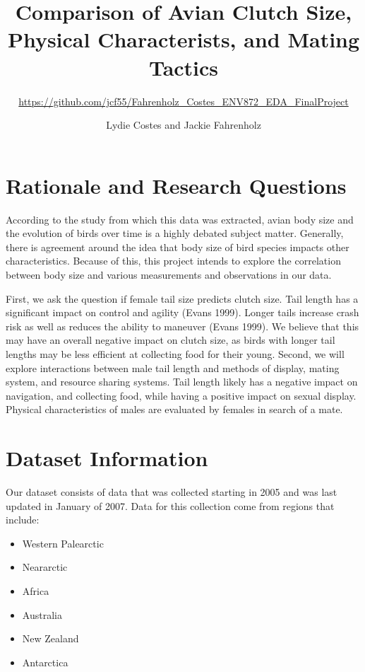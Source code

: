 \documentclass[
  12pt,
]{article}
\title{Comparison of Avian Clutch Size, Physical Characterists, and
Mating Tactics}
\subtitle{\url{https://github.com/jcf55/Fahrenholz_Costes_ENV872_EDA_FinalProject}}
\author{Lydie Costes and Jackie Fahrenholz}
\date{}
\providecommand{\tightlist}{%
  \setlength{\itemsep}{0pt}\setlength{\parskip}{0pt}}
\begin{document}
\maketitle

\newpage
\tableofcontents 
\newpage
\listoftables 
\listoffigures 
\newpage

\hypertarget{rationale-and-research-questions}{%
\section{Rationale and Research
Questions}\label{rationale-and-research-questions}}

According to the study from which this data was extracted, avian body
size and the evolution of birds over time is a highly debated subject
matter. Generally, there is agreement around the idea that body size of
bird species impacts other characteristics. Because of this, this
project intends to explore the correlation between body size and various
measurements and observations in our data.

First, we ask the question if female tail size predicts clutch size.
Tail length has a significant impact on control and agility (Evans
1999). Longer tails increase crash risk as well as reduces the ability
to maneuver (Evans 1999). We believe that this may have an overall
negative impact on clutch size, as birds with longer tail lengths may be
less efficient at collecting food for their young. Second, we will
explore interactions between male tail length and methods of display,
mating system, and resource sharing systems. Tail length likely has a
negative impact on navigation, and collecting food, while having a
positive impact on sexual display. Physical characteristics of males are
evaluated by females in search of a mate.

\hypertarget{dataset-information}{%
\section{Dataset Information}\label{dataset-information}}

Our dataset consists of data that was collected starting in 2005 and was
last updated in January of 2007. Data for this collection come from
regions that include:

\begin{itemize}
\tightlist
\item
  Western Palearctic
\item
  Neararctic
\item
  Africa
\item
  Australia
\item
  New Zealand
\item
  Antarctica
\end{itemize}
\end{document}

